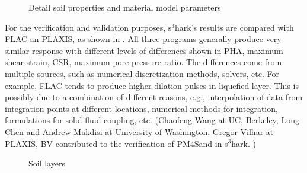 \begin{figure}[!htbp]
  \centering 
    
  \caption{Detail soil properties and material model parameters}
  \label{fig:s3hark6}
\end{figure}

For the verification and validation purposes, s$^3$hark's results are compared with FLAC an PLAXIS, as shown in . 
All three programs generally produce very similar response with
different levels of differences shown in PHA, maximum shear strain, CSR, maximum pore pressure ratio. 
The differences come from multiple sources, such as numerical discretization methods, solvers, etc.
For example, FLAC tends to produce higher dilation pulses in liquefied layer. 
This is possibly due to a combination of different reasons, e.g.,
interpolation of data from integration points at different
locations, numerical methods for integration, formulations for
solid fluid coupling, etc.
(Chaofeng Wang at UC, Berkeley, Long Chen and Andrew Makdisi at University of Washington,  
Gregor Vilhar at PLAXIS, BV contributed to the verification of PM4Sand in s$^3$hark. )

\begin{figure}[!htbp]
  \caption{Soil layers }
  \label{fig:s3hark7}
\end{figure}
